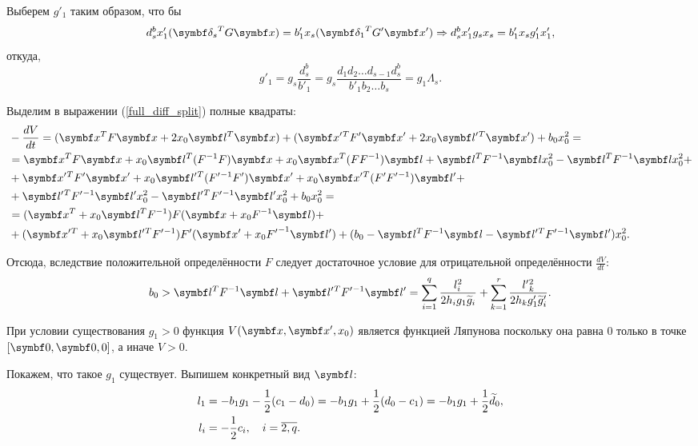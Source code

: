 Выберем \(g'_1\) таким образом, что бы
\begin{equation} \label{split_delta_g1}
    d^b_s x'_1 (\mb{\delta_s}^T G \mb{x}) = b'_1 x_s (\mb{\delta_1}^T G' \mb{x'}) \Rightarrow 
    d^b_s x'_1 g_s x_s = b'_1 x_s g'_1 x'_1,
\end{equation}
откуда,
\begin{equation}
    g'_1 = g_s \frac{d^b_s}{b'_1} = g_s \frac{d_1 d_2 \dots d_{s-1} d^b_s}{b'_1 b_2 \dots b_s} = g_1 \Lambda_s.
\end{equation}

Выделим в выражении (\ref{full_diff_split}) полные квадраты:
\begin{equation*}
    \begin{split}
        & -\frac{dV}{dt} = (\mb{x}^T F \mb{x} + 2 x_0 \mb{l}^T \mb{x}) + (\mb{x'}{}^T F' \mb{x'} + 2 x_0 \mb{l'}{}^T \mb{x'}) + b_0 x_0^2 = \\
        & = \mb{x}^T F \mb{x} + x_0 \mb{l}^T (F^{-1} F) \mb{x} + x_0 \mb{x}^T (F F^{-1}) \mb{l} + \mb{l}^T F^{-1} \mb{l} x^2_0 - \mb{l}^T F^{-1} \mb{l} x^2_0 + \\
        & + \mb{x'}{}^T F' \mb{x'} + x_0 \mb{l'}{}^T (F'{}^{-1} F') \mb{x'} + x_0 \mb{x'}{}^T (F' F'{}^{-1}) \mb{l'} + \\
        & + \mb{l'}{}^T F'{}^{-1} \mb{l'} x^2_0 - \mb{l'}{}^T F'{}^{-1} \mb{l'} x^2_0 + b_0 x_0^2 = \\
        & = (\mb{x}^T + x_0 \mb{l}^T F^{-1})F(\mb{x} + x_0 F^{-1} \mb{l}) + \\
        & + (\mb{x'}{}^T + x_0 \mb{l'}{}^T F'{}^{-1})F'(\mb{x'} + x_0 F{'}^{-1} \mb{l'}) + (b_0 - \mb{l}^T F^{-1} \mb{l} - \mb{l'}{}^T F'{}^{-1} \mb{l'}) x^2_0.
    \end{split}
\end{equation*}

Отсюда, вследствие положительной определённости \(F\) следует достаточное условие для отрицательной определённости \(\frac{dV}{dt}\):
\begin{equation} \label{split_b_dost}
    b_0 > \mb{l}^T F^{-1} \mb{l} + \mb{l'}{}^T F'{}^{-1} \mb{l'} = \sum_{i=1}^{q} \frac{l^2_i}{2h_i g_1 \wt{g}_i} + \sum_{k=1}^{r} \frac{l'{}^2_k}{2h_k g'_1 \wt{g}'_i}.
\end{equation}

При условии существования \(g_1 > 0\) функция \(V(\mb{x}, \mb{x'}, x_0)\) является функцией Ляпунова поскольку она равна \(0\) только в точке \([\mb{0}, \mb{0}, 0]\), а иначе \(V > 0\).

Покажем, что такое \(g_1\) существует. Выпишем конкретный вид \(\mb{l}\):
\begin{equation}
    \begin{split}
        l_1 &= -b_1 g_1 - \frac{1}{2} (c_1 - d_0) = -b_1 g_1 + \frac{1}{2} (d_0 - c_1) = -b_1 g_1 + \frac{1}{2} \widetilde{d}_0, \\
        l_i &= -\frac{1}{2} c_i, \quad i=\overline{2,q}.
    \end{split}
\end{equation}

